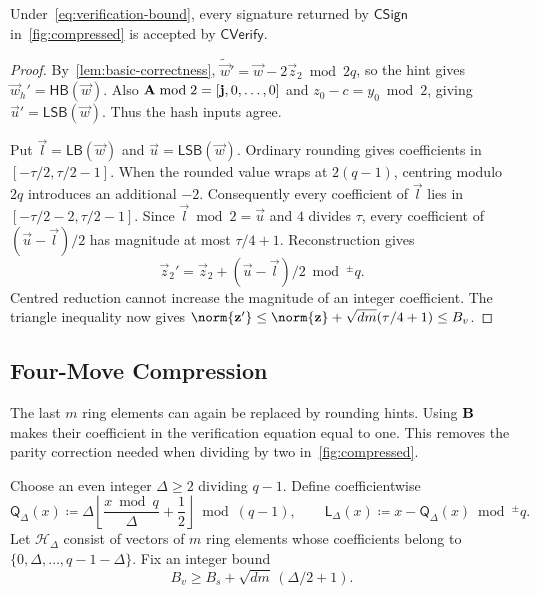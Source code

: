 \begin{lemma}
\label{lem:compressed-correctness}
Under~\cref{eq:verification-bound}, every signature returned by $\mathsf{CSign}$ in~\cref{fig:compressed} is accepted by $\mathsf{CVerify}$.
\end{lemma}
\begin{proof}
By~\cref{lem:basic-correctness}, $\widetilde{\vec w}'=\vec w-2\vec z_2\bmod2q$, so the hint gives $\vec{w}_{h}'=\mathsf{HB}(\vec w)$. Also $\mathbf{A}\bmod2=[\mathbf{j},0,\ldots,0]$ and $z_0-c=y_0\bmod2$, giving $\vec u'=\mathsf{LSB}(\vec w)$. Thus the hash inputs agree.

Put $\vec l=\mathsf{LB}(\vec w)$ and $\vec u=\mathsf{LSB}(\vec w)$. Ordinary rounding gives coefficients in $[-\tau/2,\tau/2-1]$. When the rounded value wraps at $2(q-1)$, centring modulo $2q$ introduces an additional $-2$. Consequently every coefficient of $\vec l$ lies in $[-\tau/2-2,\tau/2-1]$. Since $\vec l\bmod2=\vec u$ and $4$ divides $\tau$, every coefficient of $(\vec u-\vec l)/2$ has magnitude at most $\tau/4+1$. Reconstruction gives
\[
 \vec z_2'=\vec z_2+(\vec u-\vec l)/2\bmod^{\pm}q.
\]
Centred reduction cannot increase the magnitude of an integer coefficient. The triangle inequality now gives $\norm{\vec z'}\le\norm{\vec z}+\sqrt{dm}(\tau/4+1)\le B_v$.
\end{proof}

\FloatBarrier
\subsection{Four-Move Compression}
\label{app:four-compression}

The last $m$ ring elements can again be replaced by rounding hints. Using $\mathbf{B}$ makes their coefficient in the verification equation equal to one. This removes the parity correction needed when dividing by two in~\cref{fig:compressed}.

\begin{definition}
\label{def:four-rounding}
Choose an even integer $\Delta\ge2$ dividing $q-1$. Define coefficientwise
\[
 \mathsf{Q}_\Delta(x)\coloneqq
 \Delta\left\lfloor\frac{x\bmod q}{\Delta}+\frac12\right\rfloor\bmod(q-1),
 \qquad
 \mathsf{L}_\Delta(x)\coloneqq x-\mathsf{Q}_\Delta(x)\bmod^{\pm}q.
\]
Let $\mathcal H_\Delta$ consist of vectors of $m$ ring elements whose coefficients belong to $\{0,\Delta,\ldots,q-1-\Delta\}$. Fix an integer bound
\begin{equation}
\label{eq:four-verification-bound}
 B_v\ge B_s+\sqrt{dm}\,(\Delta/2+1).
\end{equation}
\end{definition}

